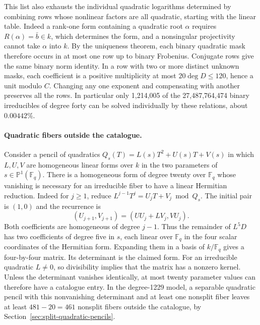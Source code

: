 \documentclass[11pt]{article}
\begin{document}
This list also exhausts the individual quadratic logarithms
determined by combining rows whose nonlinear factors are all
quadratic, starting with the linear table. Indeed a rank-one form
containing a quadratic root \(\alpha\) requires
\(R(\alpha)=\bar b\in k\), which determines the form, and a
nonsingular projectivity cannot take \(\alpha\) into \(k\).
By the uniqueness theorem, each binary quadratic mask therefore
occurs in at most one row up to binary Frobenius. Conjugate rows
give the same binary norm identity. In a row with two or more
distinct unknown masks, each coefficient is a positive
multiplicity at most \(20\deg D\le120\), hence a unit modulo
\(C\). Changing any one exponent and compensating with another
preserves all the rows. In particular only 1,214,005 of the
27,487,764,474 binary irreducibles of degree forty can be solved
individually by these relations, about \(0.00442\%\).

\paragraph{Quadratic fibers outside the catalogue.}
Consider a pencil of quadratics
\(Q_s(T)=L(s)T^2+U(s)T+V(s)\) in which \(L,U,V\) are homogeneous
linear forms over \(k\) in the two parameters of
\(s\in\mathbb P^1(\mathbb F_q)\).
There is a homogeneous form of degree twenty over \(\mathbb F_q\)
whose vanishing is necessary for an irreducible fiber to have a
linear Hermitian reduction. Indeed for \(j\ge1\), reduce
\(L^{j-1}T^j=U_jT+V_j\bmod Q_s\). The initial pair is \((1,0)\)
and the recurrence is
\[
 (U_{j+1},V_{j+1})=(U U_j+L V_j,V U_j).
\]
Both coefficients are homogeneous of degree \(j-1\).
Thus the remainder of \(L^5D\) has two coefficients of degree five
in \(s\), each linear over \(\mathbb F_q\) in the four scalar
coordinates of the Hermitian form. Expanding them in a basis of
\(k/\mathbb F_q\) gives a four-by-four matrix. Its determinant is
the claimed form. For an irreducible quadratic \(L\ne0\), so
divisibility implies that the matrix has a nonzero kernel.
Unless the determinant vanishes identically, at most twenty
parameter values can therefore have a catalogue entry. In the
degree-1229 model, a separable quadratic pencil with this
nonvanishing determinant and at least one nonsplit fiber leaves
at least \(481-20=461\) nonsplit fibers outside the catalogue,
by Section~\ref{sec:split-quadratic-pencils}.
\end{document}

